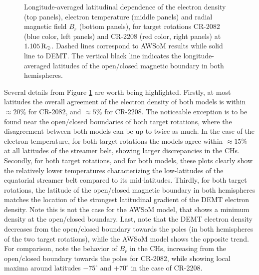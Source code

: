 \documentclass[namedreferences]{solarphysics}
\newcommand{\mdeg}{^\circ}
\newcommand{\mrsun}{{\rm R_\odot}}
\begin{document}
\begin{article}
\begin{figure}[h!]
\begin{center}
\caption{Longitude-averaged latitudinal dependence of the electron density ({top panels}), {electron temperature ({middle panels})} and {radial magnetic field $B_r$ (bottom panels), for target rotations} CR-2082 ({blue color, left panels}) and CR-2208 ({red color, right panels) at} $1.105\,\mrsun$. Dashed lines correspond to AWSoM results while solid line to DEMT. The vertical black line indicates the longitude-averaged latitudes of the open/closed magnetic boundary in both hemispheres.}
\label{perf_lat}
\end{center}
\end{figure}

{{Several details from Figure \ref{perf_lat} are worth being highlighted. Firstly, at most latitudes the overall agreement of the electron density of both models is within $\approx 20\%$ for CR-2082, and $\approx 5\%$ for CR-2208. The noticeable exception is to be found near the open/closed boundaries of both target rotations, where the disagreement between both models can be up to twice as much. In the case of the electron temperature, for both target rotations the models agree within $\approx 15\%$ at all latitudes of the streamer belt, showing larger discrepancies in the CHs.} Secondly, for both target rotations, and for both models, these plots clearly show the relatively lower temperatures characterizing the low-latitudes of the equatorial streamer belt compared to its mid-latitudes. Thirdly, for both target rotations, the latitude of the open/closed magnetic boundary in both hemispheres matches the location of the strongest latitudinal gradient of the DEMT electron density. Note this is not the case for the AWSoM model, that shows a minimum density at the open/closed boundary. Last, note that the DEMT electron density decreases from the open/closed boundary towards the poles (in both hemispheres of the two target rotations), while the AWSoM model shows the opposite trend. {For comparison, note the behavior of $B_r$ in the CHs, increasing from the open/closed boundary towards the poles for CR-2082, while showing local maxima around latitudes $-75\mdeg$ and $+70\mdeg$ in the case of CR-2208.}}


\end{article}
\end{document}
